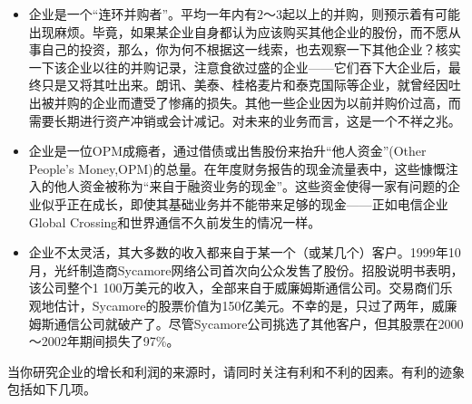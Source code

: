 \documentclass[12pt,oneside]{book}
\begin{document}
\begin{itemize}
\item 企业是一个“连环并购者”。平均一年内有2～3起以上的并购，则预示着有可能出现麻烦。毕竟，如果某企业自身都认为应该购买其他企业的股份，而不愿从事自己的投资，那么，你为何不根据这一线索，也去观察一下其他企业？核实一下该企业以往的并购记录，注意食欲过盛的企业——它们吞下大企业后，最终只是又将其吐出来。朗讯、美泰、桂格麦片和泰克国际等企业，就曾经因吐出被并购的企业而遭受了惨痛的损失。其他一些企业因为以前并购价过高，而需要长期进行资产冲销或会计减记。对未来的业务而言，这是一个不祥之兆。
\item 企业是一位OPM成瘾者，通过借债或出售股份来抬升“他人资金”(Other People's Money,OPM)的总量。在年度财务报告的现金流量表中，这些慷慨注入的他人资金被称为“来自于融资业务的现金”。这些资金使得一家有问题的企业似乎正在成长，即使其基础业务并不能带来足够的现金——正如电信企业Global Crossing和世界通信不久前发生的情况一样。
\item 企业不太灵活，其大多数的收入都来自于某一个（或某几个）客户。1999年10月，光纤制造商Sycamore网络公司首次向公众发售了股份。招股说明书表明，该公司整个1 100万美元的收入，全部来自于威廉姆斯通信公司。交易商们乐观地估计，Sycamore的股票价值为150亿美元。不幸的是，只过了两年，威廉姆斯通信公司就破产了。尽管Sycamore公司挑选了其他客户，但其股票在2000～2002年期间损失了97\%。
\end{itemize}


当你研究企业的增长和利润的来源时，请同时关注有利和不利的因素。有利的迹象包括如下几项。
\end{document}
